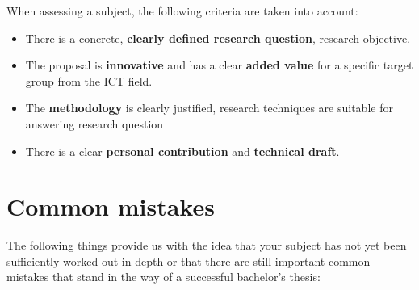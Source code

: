 When assessing a subject, the following criteria are taken into account:

\begin{itemize}
 \item There is a concrete, \textbf{clearly defined research question}, research objective.
 \item The proposal is \textbf{innovative} and has a clear \textbf{added value} for a specific target group from the ICT field.
 \item The \textbf{methodology} is clearly justified, research techniques are suitable for answering research question
 \item There is a clear \textbf{personal contribution} and \textbf{technical draft}.
\end{itemize}

\section{Common mistakes}
\label{sec:subjectcommonmistakes}

The following things provide us with the idea that your subject has not yet been sufficiently worked out in depth or that there are still important common mistakes that stand in the way of a successful bachelor's thesis:

